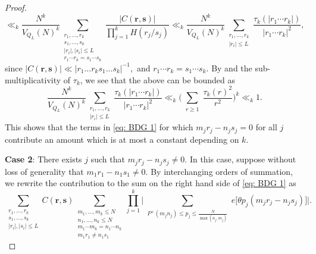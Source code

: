 \documentclass[12pt]{amsart}
\renewcommand{\leq}{\leqslant}
\renewcommand{\ge}{\geqslant}
\numberwithin{equation}{section}
\theoremstyle{plain}
\theoremstyle{definition}
\begin{document}
\begin{proof}
		\begin{equation}\label{eq: BDG 4}
			\ll_k \frac{ N^k}{V_{Q_L}(N)^k}\sum_{\substack{r_1,\dots ,r_k \\ s_1,\dots ,s_k \\ |r_i|,|s_i| \leq L \\ r_1 \cdots r_k = s_1 \cdots s_k}}\frac{|C(\bm{r,s})|}{\prod_{j = 1}^k H(r_j/s_j)} \ll_k \frac{N^k}{V_{Q_L}(N)^k}\sum_{\substack{r_1,\dots ,r_k \\ |r_i|\leq L}}\frac{\tau_k(|r_1\cdots r_k|)}{|r_1\cdots r_k|^2},
		\end{equation}
		since $|C(\bm{r,s})| \ll |r_1 \dots  r_k s_1 \dots  s_k|^{-1},$ and $r_1 \cdots r_k = s_1\cdots s_k.$ By  and the sub-multiplicativity of $\tau_k$, we see that the above can be bounded as
		\begin{equation}\label{eq: BDG 5}
			\frac{N^k}{V_{Q_L}(N)^k}\sum_{\substack{r_1,\dots ,r_k \\ |r_i|\leq L}}\frac{\tau_k(|r_1\cdots r_k|)}{|r_1\cdots r_k|^2} \ll_k \bigg(\sum_{\substack{r \ge 1}}\frac{\tau_k(r)^2}{r^2}\bigg)^k \ll_k 1.
		\end{equation}
		This shows that the terms in \eqref{eq: BDG 1} for which $m_jr_j-n_js_j = 0 $ for all $j$ contribute an amount which is at most a constant depending on $k$.
		
		\textbf{Case 2}: There exists $j$ such that $m_jr_j-n_js_j \ne 0 $. In this case, suppose without loss of generality that $m_1r_1-n_1s_1 \ne 0.$ By interchanging orders of summation, we rewrite the contribution to the sum on the right hand side of \eqref{eq: BDG 1} as
		\begin{equation}\label{eq: BDG 6}
			\sum_{\substack{r_1,\dots ,r_k \\ s_1,\dots ,s_k \\ |r_i|,|s_i| \leq L}}C(\bm{r,s})\sum_{\substack{m_1,\dots, m_k\leq N\\ n_1,\dots ,n_k \leq N\\ m_1\cdots m_k=n_1 \cdots n_k \\ m_1r_1 \ne n_1s_1}} \prod_{j=1}^k	\bigg|\sum_{\substack{ P^+(m_jn_j) \leq p_j \leq \frac{N}{\max(n_j,m_j)}}} e\big[\theta p_j(m_jr_j-n_js_j)\big]\bigg|.
		\end{equation}
		

\end{proof}
\end{document}
